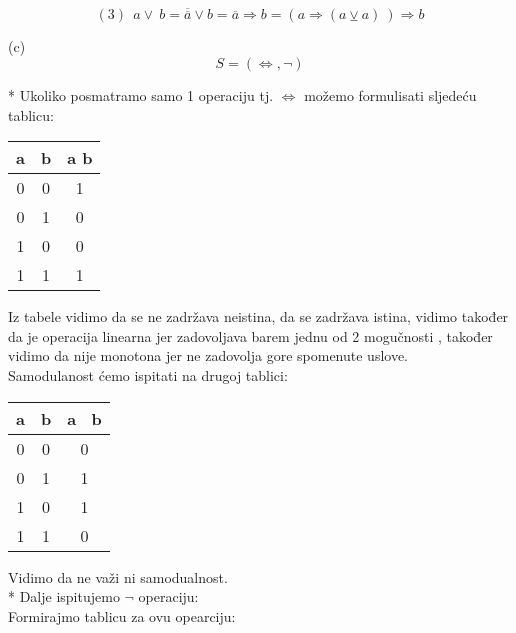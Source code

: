 \documentclass[12pt]{article}
\begin{document}
\begin{enumerate}
\begin{equation*}
              (3)~~a \vee~b = \overline{\overline{a}} \vee b = \overline{a} \Rightarrow b = (a \Rightarrow (a \veebar{} a)~) \Rightarrow b
              
		  \end{equation*}
		  
		  \newpage
		  
		  (c) \begin{equation*}
		       S = (\Leftrightarrow, \neg) 
		  \end{equation*}
		  
		  * Ukoliko posmatramo samo 1 operaciju tj. {$\Leftrightarrow$} možemo formulisati sljedeću tablicu: \\
		  
		  \begin{tabular}{|c|c|c|}
    	    \hline a & b & a \Leftrightarrow b \\
    	    \hline 0 & 0 & 1 \\
    	    \hline 0 & 1 & 0 \\
    	    \hline 1 & 0 & 0 \\
        	\hline 1 & 1 & 1 \\
        	\hline
        	
          \end{tabular}
		  
		  Iz tabele vidimo da se ne zadržava neistina, da se zadržava istina, vidimo također da je operacija linearna jer zadovoljava barem jednu od 2 mogučnosti , također vidimo da nije monotona jer ne zadovolja gore spomenute uslove. \\
		  
		  Samodulanost ćemo ispitati na drugoj tablici: 
		  
		  \begin{tabular}{|c|c|c|}
    	    \hline a & b & a \veebar{}~b \\
    	    \hline 0 & 0 & 0 \\
    	    \hline 0 & 1 & 1 \\
    	    \hline 1 & 0 & 1 \\
        	\hline 1 & 1 & 0 \\
        	\hline
        	
          \end{tabular}
          
          Vidimo da ne važi ni samodualnost. \\
          
          * Dalje ispitujemo {$\neg$} operaciju: \\   
          Formirajmo tablicu za ovu opearciju:
		  

\end{enumerate}
\end{document}
